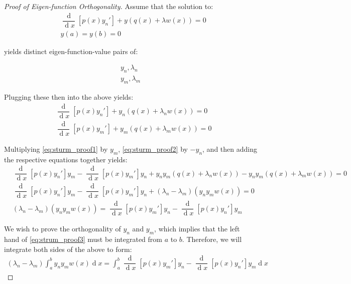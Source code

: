 \documentclass[12pt,a4paper]{report}
\DeclareMathOperator{\deriv}{d}
\theoremstyle{thms}
\theoremstyle{defns}
\begin{document}
\begin{proof}[Proof of Eigen-function Orthogonality]
    Assume that the solution to:
    \begin{align}
         & \dfrac{\deriv}{\deriv{x}}[p(x) y_n'] + y(q(x) + \lambda w(x)) = 0 \\
         & y(a) = y(b) = 0
    \end{align}

    yields distinct eigen-function-value pairs of:

    \begin{align}
        y_n, \lambda_n \\
        y_m, \lambda_m
    \end{align}

    Plugging these then into the above yields:
    \begin{align}
         & \dfrac{\deriv}{\deriv{x}}[p(x)y_n'] + y_n(q(x) + \lambda_n w(x)) = 0 \label{eq:sturm_proof1} \\
         & \dfrac{\deriv}{\deriv{x}}[p(x)y_m'] + y_m(q(x) + \lambda_m w(x)) = 0 \label{eq:sturm_proof2}
    \end{align}

    Multiplying \eqref{eq:sturm_proof1} by $y_m$, \eqref{eq:sturm_proof2} by $-y_n$, and then adding the respective equations together yields:
    \begin{align}
         & \dfrac{\deriv}{\deriv{x}}[p(x)y_n']y_m - 	\dfrac{\deriv}{\deriv{x}}[p(x)y_m']y_n + y_ny_m(q(x) + \lambda_n w(x)) - y_ny_m(q(x) + \lambda_m w(x)) = 0 \\
         & \dfrac{\deriv}{\deriv{x}}[p(x)y_n']y_m - 	\dfrac{\deriv}{\deriv{x}}[p(x)y_m']y_n + (\lambda_n - \lambda_m)(y_ny_mw(x)) = 0                           \\
         & (\lambda_n - \lambda_m)(y_ny_mw(x)) = 	\dfrac{\deriv}{\deriv{x}}[p(x)y_m']y_n - \dfrac{\deriv}{\deriv{x}}[p(x)y_n']y_m \label{eq:strum_proof3}
    \end{align}

    We wish to prove the orthogonality of $y_n$ and $y_m$, which implies that the left hand of \eqref{eq:strum_proof3} must be integrated from $a$ to $b$. Therefore, we will integrate both sides of the above to form:
    \begin{align}
        (\lambda_n - \lambda_m)\int_{a}^{b}y_ny_mw(x) \deriv{x} = \int_{a}^{b}\dfrac{\deriv}{\deriv{x}}[p(x)y_m']y_n - \dfrac{\deriv}{\deriv{x}}[p(x)y_n']y_m \deriv{x}
    \end{align}


\end{proof}
\end{document}
